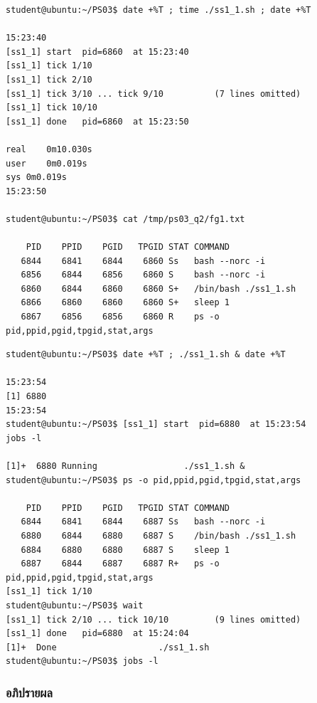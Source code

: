 \documentclass[a4paper,11pt]{article}
\newcommand{\code}[1]{\texttt{#1}}
\begin{document}
\begin{lstlisting}[style=terminal,caption={รันแบบ foreground -- terminal ถูกยึดไว้จนกว่าจะจบ พร้อมภาพจาก \code{ps} ที่สั่งถ่ายไว้ล่วงหน้า}]
student@ubuntu:~/PS03$ date +%T ; time ./ss1_1.sh ; date +%T

15:23:40
[ss1_1] start  pid=6860  at 15:23:40
[ss1_1] tick 1/10
[ss1_1] tick 2/10
[ss1_1] tick 3/10 ... tick 9/10          (7 lines omitted)
[ss1_1] tick 10/10
[ss1_1] done   pid=6860  at 15:23:50

real	0m10.030s
user	0m0.019s
sys	0m0.019s
15:23:50

student@ubuntu:~/PS03$ cat /tmp/ps03_q2/fg1.txt

    PID    PPID    PGID   TPGID STAT COMMAND
   6844    6841    6844    6860 Ss   bash --norc -i
   6856    6844    6856    6860 S    bash --norc -i
   6860    6844    6860    6860 S+   /bin/bash ./ss1_1.sh
   6866    6860    6860    6860 S+   sleep 1
   6867    6856    6856    6860 R    ps -o pid,ppid,pgid,tpgid,stat,args
\end{lstlisting}

\begin{lstlisting}[style=terminal,caption={รันแบบ background -- prompt กลับมาทันที}]
student@ubuntu:~/PS03$ date +%T ; ./ss1_1.sh & date +%T

15:23:54
[1] 6880
15:23:54
student@ubuntu:~/PS03$ [ss1_1] start  pid=6880  at 15:23:54
jobs -l

[1]+  6880 Running                 ./ss1_1.sh &
student@ubuntu:~/PS03$ ps -o pid,ppid,pgid,tpgid,stat,args

    PID    PPID    PGID   TPGID STAT COMMAND
   6844    6841    6844    6887 Ss   bash --norc -i
   6880    6844    6880    6887 S    /bin/bash ./ss1_1.sh
   6884    6880    6880    6887 S    sleep 1
   6887    6844    6887    6887 R+   ps -o pid,ppid,pgid,tpgid,stat,args
[ss1_1] tick 1/10
student@ubuntu:~/PS03$ wait
[ss1_1] tick 2/10 ... tick 10/10         (9 lines omitted)
[ss1_1] done   pid=6880  at 15:24:04
[1]+  Done                    ./ss1_1.sh
student@ubuntu:~/PS03$ jobs -l
\end{lstlisting}

\subsubsection{อภิปรายผล}
\end{document}
